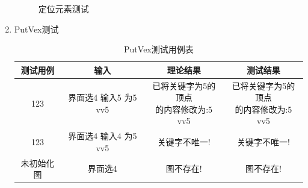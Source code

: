 \documentclass[supercite]{HustGraduPaper}
\theoremstyle{definition}
\begin{document}
\begin{enumerate}
\begin{figure}[htb]
		      \caption{定位元素测试}
	      \end{figure}
	      \newpage
	\item PutVex测试
	      \begin{table}[htb]
		      \begin{center}
			      \setlength{\tabcolsep}{2.0mm}
			      \caption{PutVex测试用例表}
			      \label{t4}
			      \begin{tabular}{|c|c|c|c|}
				      \hline
				      测试用例   & 输入                  & 理论结果                         & 测试结果      \\
				      \hline
				      \hline
				      123        & 界面选4 输入5 为5 vv5 & \makecell[c]{已将关键字为5的顶点                 \\的内容修改为:5 vv5} & \makecell[c]{已将关键字为5的顶点\\的内容修改为:5 vv5} \\
				      \hline
				      123        & 界面选4 输入4 为5 vv5 & 关键字不唯一!                    & 关键字不唯一! \\
				      \hline
				      未初始化图 & 界面选4               & 图不存在!                        & 图不存在!     \\
				      \hline
			      \end{tabular}
		      \end{center}
	      \end{table}
	      \begin{figure}[htb]
		      \centering
		      \quad
		      \quad

\end{figure}
\end{enumerate}
\end{document}

